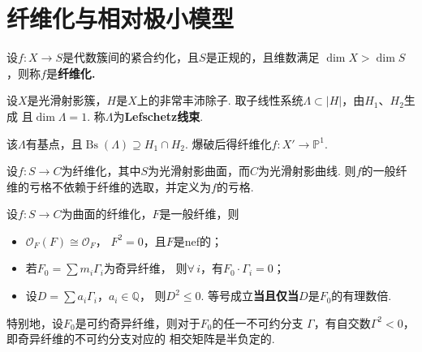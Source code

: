 \newcommand{\Q}{\mathbb{Q}}

\section{纤维化与相对极小模型}
\begin{definition}
    设$f \colon X \to S$是代数簇间的紧合约化，且$S$是正规的，且维数满足
    $\dim X > \dim S$，则称$f$是\bf{纤维化}.
\end{definition}

\begin{example}[Lefschetz线束]
    设$X$是光滑射影簇，$H$是$X$上的非常丰沛除子.
    取子线性系统$\Lambda \subset |H|$，由$H_{1}$、$H_{2}$生成
    且$\dim \Lambda = 1$. 称$\Lambda$为\textbf{Lefschetz线束}. 

    该$\Lambda$有基点，且$\operatorname{Bs}(\Lambda) \supseteq 
    H_{1} \cap H_{2}$.
    爆破后得纤维化$f \colon X' \to \mathbb{P}^{1}$.
\end{example}

\begin{lemma}
    设$f \colon S \to C$为纤维化，其中$S$为光滑射影曲面，而$C$为光滑射影曲线.
    则$f$的一般纤维的亏格不依赖于纤维的选取，并定义为$f$的亏格.
\end{lemma}

\begin{lemma}
    设$f \colon S \to C$为曲面的纤维化，$F$是一般纤维，则
    \begin{itemize}
        \item[(1)] $\mathscr{O}_{F}(F) \cong \mathscr{O}_{F}$，
        $F^{2} = 0$，且$F$是nef的；
        \item[(2)] 若$F_{0} = \sum m_{i}\Gamma_{i}$为奇异纤维，
        则$\forall \, i$，有$F_{0} \cdot \Gamma_{i} = 0$；
        \item[(3)] 设$D = \sum a_{i}\Gamma_{i}$，$a_{i} \in \Q$，
        则$D^{2} \leq 0$. 等号成立\textbf{当且仅当}$D$是$F_{0}$的有理数倍.
    \end{itemize}
    特别地，设$F_{0}$是可约奇异纤维，则对于$F_{0}$的任一不可约分支
    $\Gamma$，有自交数$\Gamma^{2} < 0$，即奇异纤维的不可约分支对应的
    相交矩阵是半负定的.
\end{lemma}

